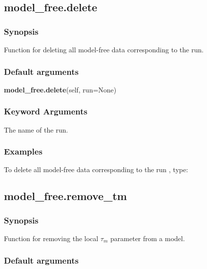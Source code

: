 


\newpage

\subsection{model\_free.delete}


\subsubsection{Synopsis}

Function for deleting all model-free data corresponding to the run.

\subsubsection{Default arguments}

\textsf{\textbf{model\_free.delete}(self, run=None)}


\subsubsection{Keyword Arguments}

  The name of the run.

\subsubsection{Examples}

To delete all model-free data corresponding to the run 
, type:




\newpage

\subsection{model\_free.remove\_tm}


\subsubsection{Synopsis}

Function for removing the local $\tau_m$ parameter from a model.

\subsubsection{Default arguments}

